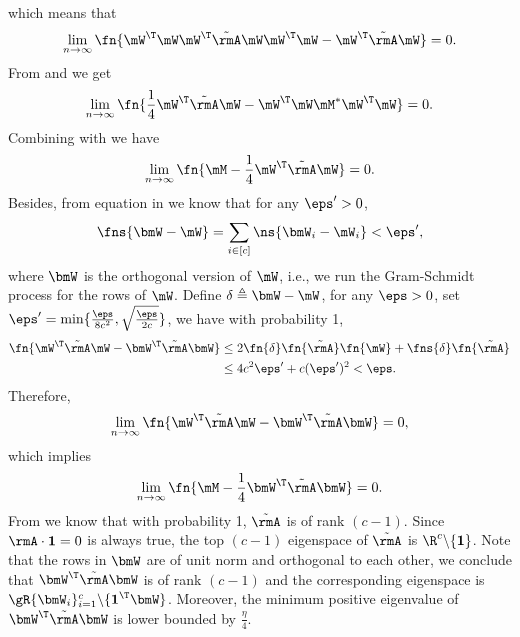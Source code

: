 which means that
\begin{equation}
\label{eqn:WTWWTAWWTW-equal-WTAW}
    \lim_{n\to\infty}\fn{\mW^\T\mW\mW^\T\tilde{\rmA}\mW\mW^\T\mW - \mW^\T\tilde{\rmA}\mW} = 0.
\end{equation}
From  and  we get
\begin{equation}
\label{eqn:WTWMWTW-equal-WTAW}
    \lim_{n\to\infty}\fn{\frac14\mW^\T\tilde{\rmA}\mW - \mW^\T\mW\mM^*\mW^\T\mW} = 0.
\end{equation}
Combining with  we have
\begin{equation}
    \lim_{n\to\infty}\fn{\mM - \frac14\mW^\T\tilde{\rmA}\mW} = 0.
\end{equation}
Besides, from equation  in  we know that for any $\eps'>0$,
\begin{equation}
    \fns{\bmW-\mW} = \sum_{i\in[c]} \ns{\bmW_i-\mW_i}<\eps',
\end{equation}
where $\bmW$ is the orthogonal version of $\mW$, i.e., we run the Gram-Schmidt process for the rows of $\mW$. Define $\delta\triangleq \bmW-\mW$, for any $\eps>0$, set $\eps'=\min\{\frac{\eps}{8c^2},\sqrt{\frac{\eps}{2c}}\}$, we have with probability 1,
\begin{equation}\begin{split}
    \fn{\mW^\T\tilde{\rmA}\mW - \bmW^\T\tilde{\rmA}\bmW} &\leq 2\fn{\delta}\fn{\tilde{\rmA}}\fn{\mW} + \fns{\delta}\fn{\tilde{\rmA}}\\&\leq 4c^2\eps'+c(\eps')^2 < \eps.
\end{split}\end{equation}
Therefore,
\begin{equation}
    \lim_{n\to\infty}\fn{\mW^\T\tilde{\rmA}\mW - \bmW^\T\tilde{\rmA}\bmW} = 0,
\end{equation}
which implies
\begin{equation}
    \lim_{n\to\infty}\fn{\mM - \frac14\bmW^\T\tilde{\rmA}\bmW} = 0.
\end{equation}
From  we know that with probability 1, $\tilde{\rmA}$ is of rank $(c-1)$. Since $\rmA\cdot\textbf{1}=0$ is always true, the top $(c-1)$ eigenspace of $\tilde{\rmA}$ is $\R^c\backslash\{\textbf{1}\}$. Note that the rows in $\bmW$ are of unit norm and orthogonal to each other, we conclude that $\bmW^\T\tilde{\rmA}\bmW$ is of rank $(c-1)$ and the corresponding eigenspace is $\gR\{\bmW_i\}_{i=1}^c\backslash\{\textbf{1}^\T\bmW\}$. Moreover, the minimum positive eigenvalue of $\bmW^\T\tilde{\rmA}\bmW$ is lower bounded by $\frac{\eta}{4}$.

